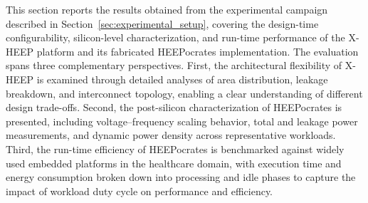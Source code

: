         This section reports the results obtained from the experimental campaign described in Section~\ref{sec:experimental_setup}, covering the design-time configurability, silicon-level characterization, and run-time performance of the \mbox{X-HEEP} platform and its fabricated \mbox{HEEPocrates} implementation. The evaluation spans three complementary perspectives. First, the architectural flexibility of \mbox{X-HEEP} is examined through detailed analyses of area distribution, leakage breakdown, and interconnect topology, enabling a clear understanding of different design trade-offs. Second, the post-silicon characterization of \mbox{HEEPocrates} is presented, including voltage–frequency scaling behavior, total and leakage power measurements, and dynamic power density across representative workloads. Third, the run-time efficiency of \mbox{HEEPocrates} is benchmarked against widely used embedded platforms in the healthcare domain, with execution time and energy consumption broken down into processing and idle phases to capture the impact of workload duty cycle on performance and efficiency.

        \begin{table}[tp]
            \caption{Area and leakage distributions among the internal components of the \mbox{X-HEEP platform}.}
            \label{tbl:pie}
            \centering
        \end{table}

